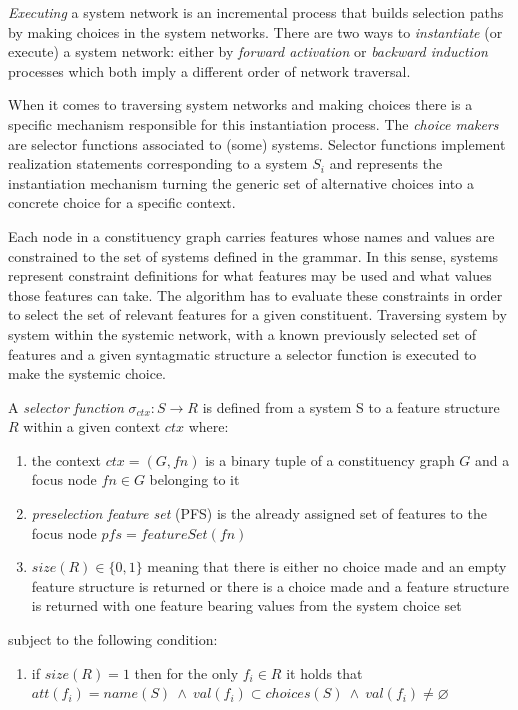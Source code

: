 \textit{Executing} a system network is an incremental process that builds selection paths by making choices in the system networks. There are two ways to \textit{instantiate} (or execute) a system network: either by \textit{forward activation} or \textit{backward induction} processes which both imply a different order of network traversal. 

When it comes to traversing system networks and making choices there is a specific mechanism responsible for this instantiation process. The \textit{choice makers} are selector functions associated to (some) systems. Selector functions implement realization statements corresponding to a system $S_{i}$ and represents the instantiation mechanism turning the generic set of alternative choices into a concrete choice for a specific context.

Each node in a constituency graph carries features whose names and values are constrained to the set of systems defined in the grammar. In this sense, systems represent constraint definitions for what features may be used and what values those features can take. The algorithm has to evaluate these constraints in order to select the set of relevant features for a given constituent. Traversing system by system within the systemic network, with a known previously selected set of features and a given syntagmatic structure a selector function is executed to make the systemic choice. 

\begin{definition}\label{def:selection-function}
	A \textit{selector function} ${\sigma_{ctx}:S \rightarrow R}$ is defined from a system S to a feature structure $R$ within a given context $ctx$ where:
	\begin{enumerate}
		\item the context $ctx=(G,fn)$ is a binary tuple of a constituency graph $G$ and a focus node $fn \in G$ belonging to it
		\item \textit{preselection feature set} (PFS) is the already assigned set of features to the focus node $pfs = featureSet(fn)$ 
		\item $size(R) \in \{0,1\}$ meaning that there is either no choice made and an empty feature structure is returned or there is a choice made and a feature structure is returned with one feature bearing values from the system choice set
	\end{enumerate}
	subject to the following condition:
	\begin{enumerate}
		\item if $size(R)=1$ then for the only $f_{i} \in R $ it holds that $att(f_{i})=name(S) \ \wedge \ val(f_{i}) \subset choices(S) \ \wedge \ val(f_{i}) \neq \varnothing $
	\end{enumerate}
\end{definition}

